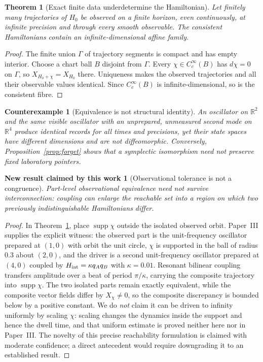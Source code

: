 \documentclass[12pt,a4paper]{article}
\theoremstyle{definition}
\theoremstyle{plain}
\newtheorem{theorem}[definition]{Theorem}
\theoremstyle{commentary}
\newtheorem{newresult}[definition]{New result claimed by this work}
\newtheorem{counterexample}[definition]{Counterexample}
\newcommand{\R}{\mathbb{R}}
\begin{document}
\begin{theorem}[Exact finite data underdetermine the Hamiltonian]\label{thm:under}
Let finitely many trajectories of $H_0$ be observed on a finite horizon, even continuously,
at infinite precision and through every smooth observable.  The consistent Hamiltonians contain
an infinite-dimensional affine family.
\end{theorem}
\begin{proof}
The finite union $\Gamma$ of trajectory segments is compact and has empty interior.  Choose a
chart ball $B$ disjoint from $\Gamma$.  Every $\chi\in C_c^\infty(B)$ has $d\chi=0$ on
$\Gamma$, so $X_{H_0+\chi}=X_{H_0}$ there.  Uniqueness makes the observed trajectories and
all their observable values identical.  Since $C_c^\infty(B)$ is infinite-dimensional, so is
the consistent fibre.
\end{proof}

\begin{counterexample}[Equivalence is not structural identity]
An oscillator on $\R^2$ and the same visible oscillator with an unprepared, unmeasured second
mode on $\R^4$ produce identical records for all times and precisions, yet their state spaces
have different dimensions and are not diffeomorphic.  Conversely, Proposition~\ref{prop:forget}
shows that a symplectic isomorphism need not preserve fixed laboratory pointers.
\end{counterexample}

\begin{newresult}[Observational tolerance is not a congruence]\label{new:nocong}
Part-level observational equivalence need not survive interconnection: coupling can enlarge the
reachable set into a region on which two previously indistinguishable Hamiltonians differ.
\end{newresult}
\begin{proof}
In Theorem~\ref{thm:under}, place $\operatorname{supp}\chi$ outside the isolated observed orbit.
Paper~III \cite{PilotIII} supplies the explicit witness: the observed part is the unit-frequency
oscillator prepared at $(1,0)$ with orbit the unit circle, $\chi$ is supported in the ball of
radius $0.3$ about $(2,0)$, and the driver is a second unit-frequency oscillator prepared at
$(4,0)$ coupled by $H_{\rm int}=\kappa q_Aq_B$ with $\kappa=0.01$.  Resonant bilinear coupling
transfers amplitude over a beat of period $\pi/\kappa$, carrying the composite trajectory into
$\operatorname{supp}\chi$.  The two
isolated parts remain exactly equivalent, while the composite vector fields differ by
$X_\chi\neq0$, so the composite discrepancy is bounded below by a positive constant.  We do
\emph{not} claim it can be driven to infinity uniformly by scaling $\chi$: scaling changes the
dynamics inside the support and hence the dwell time, and that uniform estimate is proved
neither here nor in Paper~III.  The novelty of
this precise reachability formulation is claimed with moderate confidence; a direct antecedent
would require downgrading it to an established result.
\end{proof}
\end{document}
